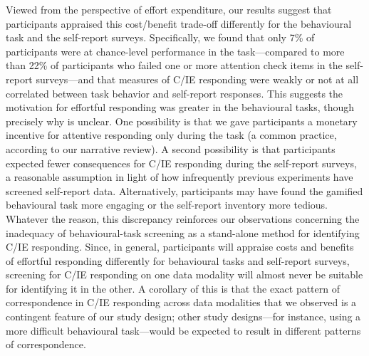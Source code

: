 \documentclass[a4paper,notitlepage,12pt]{article}
\begin{document}
Viewed from the perspective of effort expenditure, our results suggest that participants appraised this cost/benefit trade-off differently for the behavioural task and the self-report surveys. Specifically, we found that only 7\% of participants were at chance-level performance in the task---compared to more than 22\% of participants who failed one or more attention check items in the self-report surveys---and that measures of C/IE responding were weakly or not at all correlated between task behavior and self-report responses. This suggests the motivation for effortful responding was greater in the behavioural tasks, though precisely why is unclear. One possibility is that we gave participants a monetary incentive for attentive responding only during the task (a common practice, according to our narrative review). A second possibility is that participants expected fewer consequences for C/IE responding during the self-report surveys, a reasonable assumption in light of how infrequently previous experiments have screened self-report data. Alternatively, participants may have found the gamified behavioural task more engaging or the self-report inventory more tedious. Whatever the reason, this discrepancy reinforces our observations concerning the inadequacy of behavioural-task screening as a stand-alone method for identifying C/IE responding. Since, in general, participants will appraise costs and benefits of effortful responding differently for behavioural tasks and self-report surveys, screening for C/IE responding on one data modality will almost never be suitable for identifying it in the other. A corollary of this is that the exact pattern of correspondence in C/IE responding across data modalities that we observed is a contingent feature of our study design; other study designs---for instance, using a more difficult behavioural task---would be expected to result in different patterns of correspondence.
\end{document}

